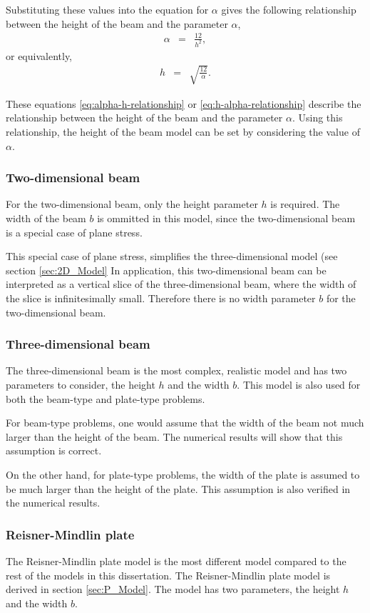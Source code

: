 \documentclass[../../main.tex]{subfiles}
\begin{document}
Substituting these values into the equation for $\alpha$ gives the following relationship between the height of the beam and the parameter $\alpha$,
\begin{eqnarray}
	\alpha & = & \frac{12}{h^2}, \label{eq:alpha-h-relationship}
\end{eqnarray}
or equivalently,
\begin{eqnarray}
	h & = & \sqrt{\frac{12}{\alpha}}. \label{eq:h-alpha-relationship}
\end{eqnarray}

These equations \eqref{eq:alpha-h-relationship} or \eqref{eq:h-alpha-relationship} describe the relationship between the height of the beam and the parameter $\alpha$. Using this relationship, the height of the beam model can be set by considering the value of $\alpha$.

\subsubsection{Two-dimensional beam}

For the two-dimensional beam, only the height parameter $h$ is required. The width of the beam $b$ is ommitted in this model, since the two-dimensional beam is a special case of plane stress.

This special case of plane stress, simplifies the three-dimensional model (see section \ref{sec:2D_Model} In application, this two-dimensional beam can be interpreted as a vertical slice of the three-dimensional beam, where the width of the slice is infinitesimally small. Therefore there is no width parameter $b$ for the two-dimensional beam.

\subsubsection{Three-dimensional beam}

The three-dimensional beam is the most complex, realistic model and has two parameters to consider, the height $h$ and the width $b$. This model is also used for both the beam-type and plate-type problems.

For beam-type problems, one would assume that the width of the beam not much larger than the height of the beam. The numerical results will show that this assumption is correct.

On the other hand, for plate-type problems, the width of the plate is assumed to be much larger than the height of the plate. This assumption is also verified in the numerical results.

\subsubsection{Reisner-Mindlin plate}
The Reisner-Mindlin plate model is the most different model compared to the rest of the models in this dissertation. The Reisner-Mindlin plate model is derived in section \ref{sec:P_Model}. The model has two parameters, the height $h$ and the width $b$.
\end{document}
